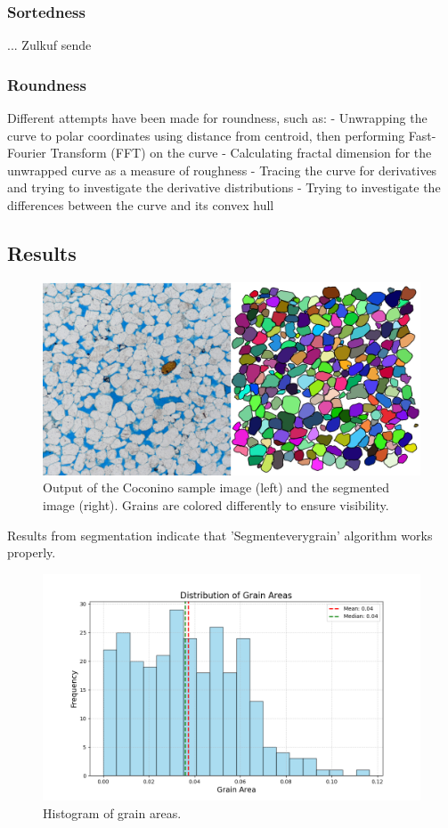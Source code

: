 \documentclass{article}
\begin{document}
\subsubsection{Sortedness}
... Zulkuf sende
\subsubsection{Roundness}
Different attempts have been made for roundness, such as:
- Unwrapping the curve to polar coordinates using distance from centroid, then performing Fast-Fourier Transform (FFT) on the curve
- Calculating fractal dimension for the unwrapped curve as a measure of roughness
- Tracing the curve for derivatives and trying to investigate the derivative distributions
- Trying to investigate the differences between the curve and its convex hull
\subsection{Results}
\begin{figure}[H]
    \centering
    \includegraphics[width=\textwidth]{coconino_segmented.png}
    \caption{Output of the Coconino sample image (left) and the segmented image (right). Grains are colored differently to ensure visibility.}
    \label{fig:coconino_segmented}
\end{figure}

Results from segmentation indicate that 'Segmenteverygrain' algorithm works properly.

\begin{figure}[H]
    \centering
    \includegraphics[width=\textwidth]{area_histogram.png}
    \caption{Histogram of grain areas.}
    \label{fig:area_histogram}
\end{figure}
\end{document}
